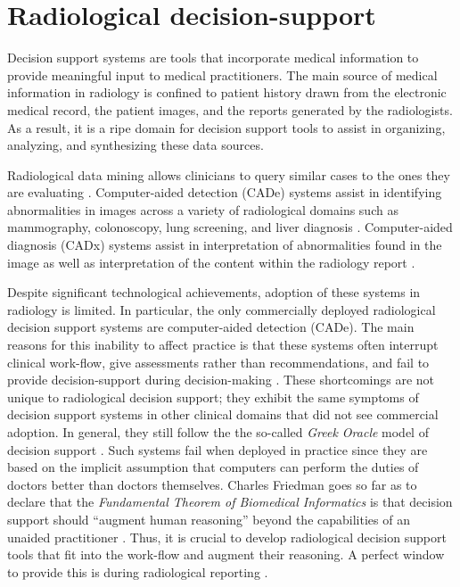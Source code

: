 \section*{Radiological decision-support}
Decision support systems are tools that incorporate medical information to provide meaningful input to medical practitioners. The main source of medical information in radiology is confined to patient history drawn from the electronic medical record, the patient images, and the reports generated by the radiologists. As a result, it is a ripe domain for decision support tools to assist in organizing, analyzing, and synthesizing these data sources. 

Radiological data mining allows clinicians to query similar cases to the ones they are evaluating \cite{Shin:2015wl,Bozkurt:2014jw,Depeursinge:2012ce,Korenblum:2011gx,Akgul:2011ey,Nassif:2009du}. Computer-aided detection (CADe) systems assist in identifying abnormalities in images across a variety of radiological domains such as mammography, colonoscopy, lung screening, and liver diagnosis \cite{Cheng:2003ig,Castellino:2005ke,Meeuwis:2010bv,Oliver:2010fm,Fenton:2011fw,Fenton:2012kz,Jamieson:2012hz,Gallas:2012eg,Giger:2013jb}. Computer-aided diagnosis (CADx) systems assist in interpretation of abnormalities found in the image \cite{Jiang:1999fj,ElizabethS:2005gc,Gallas:2012eg,Bright:2012ga,Giger:2013jb,Depeursinge:2010jl,Fujita:2008it,Eadie:2011cv,Rubin:2005jg,Garg:2005cb,Elter:2009fv,Jamieson:2010vl,Jamieson:2010tt,Cheng:2003ig,Jiang:2001fy} as well as interpretation of the content within the radiology report \cite{Burnside:2000wl,ElizabethS:2005gc,Burnside:2009br,Rubin:2005jg}.

Despite significant technological achievements, adoption of these systems in radiology is limited. In particular, the only commercially deployed radiological decision support systems are computer-aided detection (CADe). The main reasons for this inability to affect practice is that these systems often interrupt clinical  work-flow, give assessments rather than recommendations, and fail to provide decision-support during decision-making \cite{Kawamoto:2005gn,Morgan:2011ct}. These shortcomings are not unique to radiological decision support; they exhibit the same symptoms of decision support systems in other clinical domains that did not see commercial adoption. In general, they still follow the the so-called \emph{Greek Oracle} model of decision support \cite{Miller:1990wg,Miller:1994cx}. Such systems fail when deployed in practice since they are based on the implicit assumption that computers can perform the duties of doctors better than doctors themselves. Charles Friedman goes so far as to declare that the \emph{Fundamental Theorem of Biomedical Informatics} is that decision support should ``augment human reasoning'' beyond the capabilities of an unaided practitioner \cite{Friedman:2009dx}. Thus, it is crucial to develop radiological decision support tools that fit into the work-flow and augment their reasoning. A perfect window to provide this is during radiological reporting \cite{Noumeir:2006cb}.

